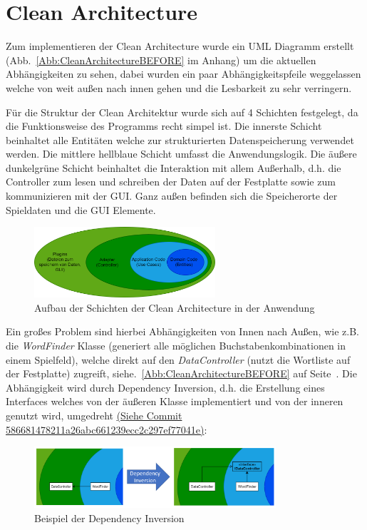 \chapter{Clean Architecture}

Zum implementieren der Clean Architecture wurde ein UML Diagramm erstellt (Abb.~\ref{Abb:CleanArchitectureBEFORE} im Anhang) um die aktuellen Abhängigkeiten zu sehen, dabei wurden ein paar Abhängigkeitspfeile weggelassen welche von weit außen nach innen gehen und die Lesbarkeit zu sehr verringern. 


Für die Struktur der Clean Architektur wurde sich auf 4 Schichten festgelegt, da die Funktionsweise des Programms recht simpel ist. Die innerste Schicht beinhaltet alle Entitäten welche zur strukturierten Datenspeicherung verwendet werden. Die mittlere hellblaue Schicht umfasst die Anwendungslogik. Die äußere dunkelgrüne Schicht beinhaltet die Interaktion mit allem Außerhalb, d.h. die Controller zum lesen und schreiben der Daten auf der Festplatte sowie zum kommunizieren mit der GUI. Ganz außen befinden sich die Speicherorte der Spieldaten und die GUI Elemente. 


\begin{figure}[!ht]
  \centering
  \includegraphics[width=0.6\textwidth]{Bilder/ArchitekturSchichten.PNG}
  \caption{Aufbau der Schichten der Clean Architecture in der Anwendung}
  \label{Abb:ArchitekturSchichten}
\end{figure}

Ein großes Problem sind hierbei Abhängigkeiten von Innen nach Außen, wie z.B. die \textit{WordFinder} Klasse (generiert alle möglichen Buchstabenkombinationen in einem Spielfeld), welche direkt auf den \textit{DataController} (nutzt die Wortliste auf der Festplatte) zugreift, siehe.~\ref{Abb:CleanArchitectureBEFORE} auf Seite~\pageref{Abb:CleanArchitectureBEFORE}. Die Abhängigkeit wird durch Dependency Inversion, d.h. die Erstellung eines Interfaces welches von der äußeren Klasse implementiert und von der inneren genutzt wird, umgedreht \href{https://github.com/EinToni/Wortfinder/commit/586681478211a26abc661239ecc2c297ef77041e}{(Siehe Commit 586681478211a26abc661239ecc2c297ef77041e)}:
\newpage
\begin{figure}[!ht]
  \centering
  \includegraphics[width=0.8\textwidth]{Bilder/DependencyInversion.PNG}
  \caption{Beispiel der Dependency Inversion}
  \label{Abb:DependencyInversion}
\end{figure}

